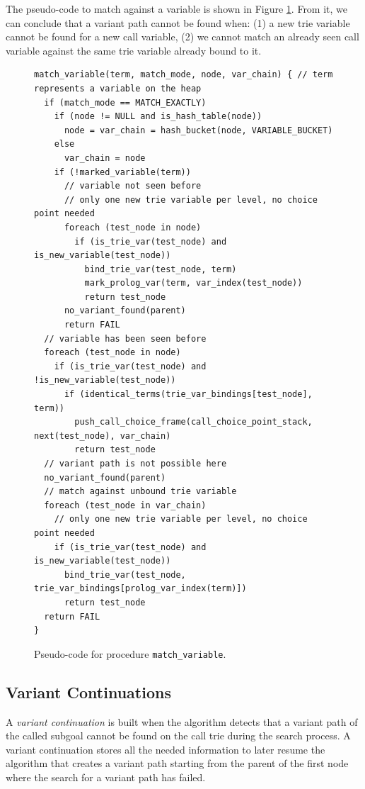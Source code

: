 The pseudo-code to match against a variable is shown in Figure
\ref{fig:match_variable}. From it, we can conclude that a variant path
cannot be found when: (1) a new trie variable cannot be found
for a new call variable, (2) we cannot match an already seen
call variable against the same trie variable already bound to it.

\begin{figure}[ht]
\begin{Verbatim}
match_variable(term, match_mode, node, var_chain) { // term represents a variable on the heap
  if (match_mode == MATCH_EXACTLY)
    if (node != NULL and is_hash_table(node))
      node = var_chain = hash_bucket(node, VARIABLE_BUCKET)
    else
      var_chain = node
    if (!marked_variable(term))
      // variable not seen before
      // only one new trie variable per level, no choice point needed
      foreach (test_node in node)
        if (is_trie_var(test_node) and is_new_variable(test_node))
          bind_trie_var(test_node, term)
          mark_prolog_var(term, var_index(test_node))
          return test_node
      no_variant_found(parent)
      return FAIL
  // variable has been seen before
  foreach (test_node in node)
    if (is_trie_var(test_node) and !is_new_variable(test_node))
      if (identical_terms(trie_var_bindings[test_node], term))
        push_call_choice_frame(call_choice_point_stack, next(test_node), var_chain)
        return test_node
  // variant path is not possible here
  no_variant_found(parent)
  // match against unbound trie variable
  foreach (test_node in var_chain)
    // only one new trie variable per level, no choice point needed
    if (is_trie_var(test_node) and is_new_variable(test_node))
      bind_trie_var(test_node, trie_var_bindings[prolog_var_index(term)])
      return test_node
  return FAIL
}
\end{Verbatim}
\caption{Pseudo-code for procedure \texttt{match\_variable}.}
\label{fig:match_variable}
\end{figure}

\subsection{Variant Continuations}

A \textit{variant continuation} is built when the algorithm detects that a variant path of the
called subgoal cannot be found on the call trie during the search process.
A variant continuation stores all the needed information to later resume
the algorithm that creates a variant path starting from the parent of the first node where the
search for a variant path has failed.

